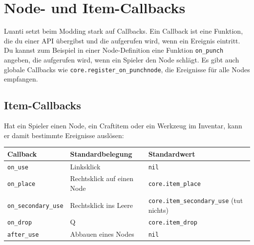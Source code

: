 \chapter{Node- und Item-Callbacks}
\label{ch:items/callbacks}

Luanti setzt beim Modding stark auf Callbacks.
Ein Callback ist eine Funktion, die du einer API übergibst und die
aufgerufen wird, wenn ein Ereignis eintritt. Du kannst zum Beispiel in
einer Node-Definition eine Funktion
\texttt{on\_\allowbreak{}punch}
angeben, die aufgerufen wird, wenn ein Spieler den Node schlägt. Es gibt
auch globale Callbacks wie
\texttt{core.\allowbreak{}register\_\allowbreak{}on\_\allowbreak{}punchnode},
die Ereignisse für alle Nodes empfangen.

\section{Item-Callbacks}\label{item-callbacks}

Hat ein Spieler einen Node, ein Craftitem
oder ein Werkzeug im Inventar, kann er damit
bestimmte Ereignisse auslösen:

\begin{longtable}[]{@{}
  >{\raggedright\arraybackslash}p{}
  >{\raggedright\arraybackslash}p{}
  >{\raggedright\arraybackslash}p{}@{}}
\toprule\noalign{}
\begin{minipage}[b]{\linewidth}\raggedright
Callback
\end{minipage} & \begin{minipage}[b]{\linewidth}\raggedright
Standardbelegung
\end{minipage} & \begin{minipage}[b]{\linewidth}\raggedright
Standardwert
\end{minipage} \\
\midrule\noalign{}
\endhead
\bottomrule\noalign{}
\endlastfoot
\texttt{on\_\allowbreak{}use} & Linksklick & \texttt{nil} \\
\texttt{on\_\allowbreak{}place} & Rechtsklick auf einen Node &
\texttt{core.\allowbreak{}item\_\allowbreak{}place} \\
\texttt{on\_\allowbreak{}secondary\_\allowbreak{}use} & Rechtsklick ins
Leere &
\texttt{core.\allowbreak{}item\_\allowbreak{}secondary\_\allowbreak{}use}
(tut nichts) \\
\texttt{on\_\allowbreak{}drop} & Q &
\texttt{core.\allowbreak{}item\_\allowbreak{}drop} \\
\texttt{after\_\allowbreak{}use} & Abbauen eines Nodes & \texttt{nil} \\
\end{longtable}

